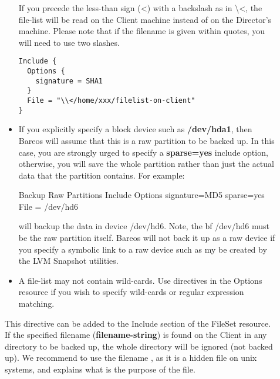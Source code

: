\begin{description}
\begin{itemize}
   If you precede the less-than sign ({\textless}) with a backslash as in
   \textbackslash{}{\textless}, the file-list will be read on the Client machine
   instead of on the Director's machine.  Please note that if the filename
   is given within quotes, you will need to use two slashes.

\footnotesize
\begin{verbatim}
Include {
  Options {
    signature = SHA1
  }
  File = "\\</home/xxx/filelist-on-client"
}
\end{verbatim}
\normalsize

\item     
    If you explicitly specify a block device such as {\bf /dev/hda1},  then
   Bareos will assume that this  is a raw partition
   to be backed up. In this case, you are strongly  urged to specify a {\bf
   sparse=yes} include option, otherwise, you  will save the whole partition
   rather than just the actual data that  the partition contains. For example:

\begin{bconfig}{Backup Raw Partitions}
Include {
  Options {
    signature=MD5
    sparse=yes
  }
  File = /dev/hd6
}
\end{bconfig}

   will backup the data in device /dev/hd6. Note, the {bf /dev/hd6} must be
   the raw partition itself. Bareos will not back it up as a raw device if
   you specify a symbolic link to a raw device such as my be created by the
   LVM Snapshot utilities.


\item A file-list may not contain wild-cards. Use directives in the
   Options resource if you wish to specify wild-cards or regular expression
   matching.

\end{itemize}



    This directive can be added to the Include section of the FileSet resource.  If the specified
    filename ({\bf filename-string}) is found on the Client in any directory to be
    backed up, the whole directory will be ignored (not backed up).
    We recommend to use the filename , as it is a hidden file on unix
    systems, and explains what is the purpose of the file.


\end{description}
